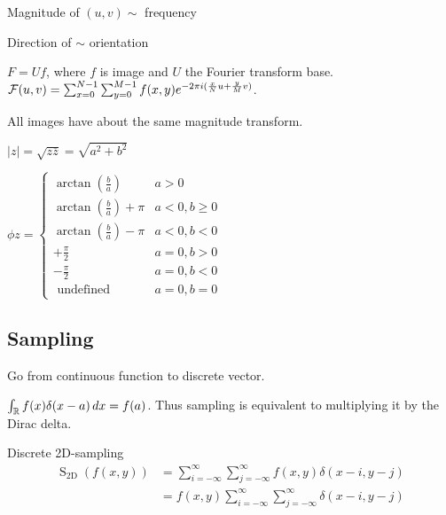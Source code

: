 \begin{itemize*}
  \item Magnitude of \((u, v) \sim\) frequency
  \item Direction of \(\sim\) orientation
\end{itemize*}

\begin{definition}[FT on Images]
 \(F = Uf\), where \(f\) is image and \(U\) the Fourier transform base.
 \(\operatorname{\mathcal{F}}(u,v) = \sum_{x = 0}^{N - 1}\sum_{y = 0}^{M - 1} f(x, y) e^{-2\pi i (\frac{x}{N}u + \frac{y}{M}v)}\).
\end{definition}

\begin{theorem}
  All images have about the same magnitude transform.
\end{theorem}

\begin{definition}[Magnitude of \(z \in \C\)]
  \(|z| = \sqrt{z \overline{z}} = \sqrt{a^2 + b^2}\)
\end{definition}

\begin{definition}[Phase of \(z \in \C\)]
  \(\phi{z} =\left\{\begin{array}{ll}\arctan \left(\frac{b}{a}\right) & a>0 \\ \arctan \left(\frac{b}{a}\right)+\pi & a<0, b \geq 0 \\ \arctan \left(\frac{b}{a}\right)-\pi & a<0, b<0 \\ +\frac{\pi}{2} & a=0, b>0 \\ -\frac{\pi}{2} & a=0, b<0 \\ \text { undefined } & a=0, b=0\end{array}\right.\)
\end{definition}

\subsection{Sampling}
Go from continuous function to discrete vector.

\begin{definition}
  \(\int_{\operatorname{\mathbb{R}}}f(x)\delta(x - a) \,dx = f(a)\). Thus sampling is equivalent to multiplying it by the Dirac delta.
\end{definition}

\begin{definition}
  Discrete 2D-sampling
  \[\begin{aligned} \operatorname{S}_{2 \mathrm{D}}(f(x, y)) & =\sum_{i=-\infty}^{\infty} \sum_{j=-\infty}^{\infty} f(x, y) \delta(x-i, y-j) \\ & =f(x, y) \sum_{i=-\infty}^{\infty} \sum_{j=-\infty}^{\infty} \delta(x-i, y-j)\end{aligned}\]
\end{definition}

